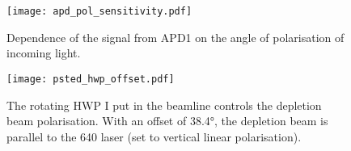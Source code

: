 \begin{figure}[h]
	\centering
	\texttt{[image: apd\_pol\_sensitivity.pdf]}
	\caption{Dependence of the signal from APD1 on the angle of polarisation of incoming light.}
	\label{fig:apd pol sensitivity}
\end{figure}


\begin{figure}[h]
	\centering
	\texttt{[image: psted\_hwp\_offset.pdf]}
	\caption{
		The rotating HWP I put in the beamline controls the depletion beam polarisation. With an offset of 38.4°, the depletion beam is parallel to the 640 laser (set to vertical linear polarisation).
	}
	\label{fig:psted hwp offset}
\end{figure}